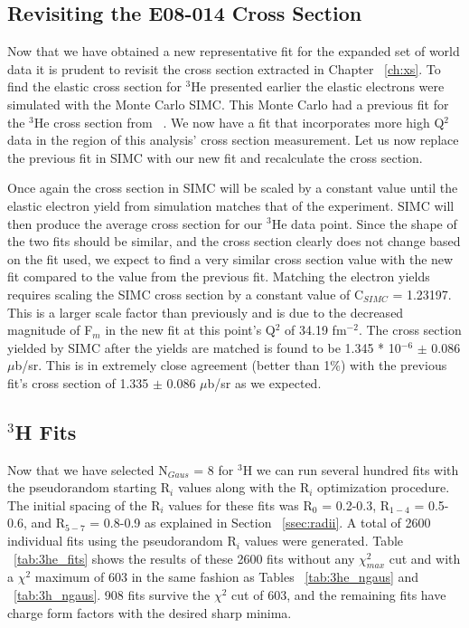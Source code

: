 \subsection{Revisiting the E08-014 Cross Section}
\label{ssec:xs_revisit}

Now that we have obtained a new representative fit for the expanded set of world data it is prudent to revisit the cross section extracted in Chapter ~\ref{ch:xs}. To find the elastic cross section for $^3$He presented earlier the elastic electrons were simulated with the Monte Carlo SIMC. This Monte Carlo had a previous fit for the $^3$He cross section from ~\cite{Article:Amroun}. We now have a fit that incorporates more high Q$^2$ data in the region of this analysis' cross section measurement. Let us now replace the previous fit in SIMC with our new fit and recalculate the cross section.

Once again the cross section in SIMC will be scaled by a constant value until the elastic electron yield from simulation matches that of the experiment. SIMC will then produce the average cross section for our $^3$He data point. Since the shape of the two fits should be similar, and the cross section clearly does not change based on the fit used, we expect to find a very similar cross section value with the new fit compared to the value from the previous fit. Matching the electron yields requires scaling the SIMC cross section by a constant value of C$_{SIMC}$ = 1.23197. This is a larger scale factor than previously and is due to the decreased magnitude of F$_m$ in the new fit at this point's Q$^2$ of 34.19 fm$^{-2}$. The cross section yielded by SIMC after the yields are matched is found to be 1.345 * 10$^{-6}$ $\pm$ 0.086 $\mu$b/sr. This is in extremely close agreement (better than 1$\%$) with the previous fit's cross section of 1.335 $\pm$ 0.086 $\mu$b/sr as we expected.

\subsection{$^3$H Fits}
\label{ssec:3h_fits}

Now that we have selected N$_{Gaus}$ = 8 for $^3$H we can run several hundred fits with the pseudorandom starting R$_i$ values along with the R$_i$ optimization procedure. The initial spacing of the R$_i$ values for these fits was R$_0$ = 0.2-0.3, R$_{1-4}$ = 0.5-0.6, and R$_{5-7}$ = 0.8-0.9 as explained in Section ~\ref{ssec:radii}. A total of 2600 individual fits using the pseudorandom R$_i$ values were generated. Table ~\ref{tab:3he_fits} shows the results of these 2600 fits without any $\chi^2_{max}$ cut and with a $\chi^2$ maximum of 603 in the same fashion as Tables ~\ref{tab:3he_ngaus} and ~\ref{tab:3h_ngaus}. 908 fits survive the $\chi^2$ cut of 603, and the remaining fits have charge form factors with the desired sharp minima.

